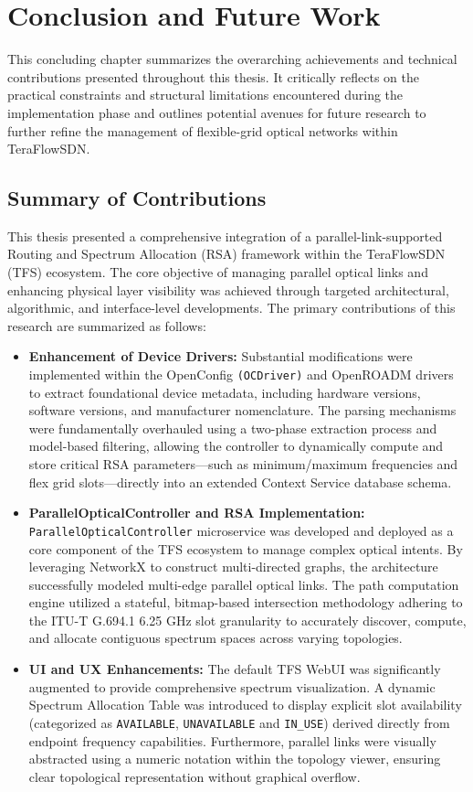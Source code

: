 \chapter{Conclusion and Future Work}
This concluding chapter summarizes the overarching achievements and technical contributions presented throughout this thesis. It critically reflects on the practical constraints and structural limitations encountered during the implementation phase and outlines potential avenues for future research to further refine the management of flexible-grid optical networks within TeraFlowSDN.
\section{Summary of Contributions}
This thesis presented a comprehensive integration of a parallel-link-supported Routing and Spectrum Allocation (RSA) framework within the TeraFlowSDN (TFS) ecosystem. The core objective of managing parallel optical links and enhancing physical layer visibility was achieved through targeted architectural, algorithmic, and interface-level developments. The primary contributions of this research are summarized as follows:
\begin{itemize}
    \item \textbf{Enhancement of Device Drivers:} Substantial modifications were implemented within the OpenConfig \texttt{(OCDriver)} and OpenROADM drivers to extract foundational device metadata, including hardware versions, software versions, and manufacturer nomenclature. The parsing mechanisms were fundamentally overhauled using a two-phase extraction process and model-based filtering, allowing the controller to dynamically compute and store critical RSA parameters—such as minimum/maximum frequencies and flex grid slots—directly into an extended Context Service database schema.
    \item \textbf{ParallelOpticalController and RSA Implementation:}\\ \texttt{ParallelOpticalController} microservice was developed and deployed as a core component of the TFS ecosystem to manage complex optical intents. By leveraging NetworkX to construct multi-directed graphs, the architecture successfully modeled multi-edge parallel optical links. The path computation engine utilized a stateful, bitmap-based intersection methodology adhering to the ITU-T G.694.1 6.25 GHz slot granularity to accurately discover, compute, and allocate contiguous spectrum spaces across varying topologies.
    \item \textbf{UI and UX Enhancements:} The default TFS WebUI was significantly augmented to provide comprehensive spectrum visualization. A dynamic Spectrum Allocation Table was introduced to display explicit slot availability (categorized as \texttt{AVAILABLE}, \texttt{UNAVAILABLE} and \texttt{IN\_USE}) derived directly from endpoint frequency capabilities. Furthermore, parallel links were visually abstracted using a numeric notation within the topology viewer, ensuring clear topological representation without graphical overflow.
\end{itemize}
